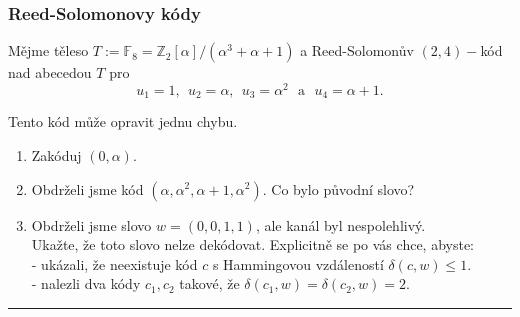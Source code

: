 \documentclass[10pt,a4paper]{article}
\newcommand{\Z}{{\mathbb{Z}}}       %
\newcommand{\F}{{\mathbb{F}}}       %
\newcommand{\hr}{{\begin{center}\par\rule{\textwidth}{0.5pt} \end{center}}}
\begin{document}
\subsubsection{Reed-Solomonovy kódy}
Mějme těleso $T:=\F_8=\Z_2[\alpha]/(\alpha^3+\alpha + 1)$ a Reed-Solomonův $(2,4)-$kód nad abecedou $T$ pro $$u_1=1, ~~u_2=\alpha, ~~u_3 = \alpha^2 \text{ ~a~ } u_4 = \alpha + 1.$$

Tento kód může opravit jednu chybu.
\begin{enumerate}[label=(\alph*)]
    \item Zakóduj $(0,\alpha)$.
    \item Obdrželi jsme kód $(\alpha,\alpha^2, \alpha + 1,\alpha^2)$. Co bylo původní slovo?
    \item Obdrželi jsme slovo $w = (0,0, 1,1)$, ale kanál byl nespolehlivý.\\
    Ukažte, že toto slovo nelze dekódovat. Explicitně se po vás chce, abyste:\\
    - ukázali, že neexistuje kód $c$ s Hammingovou vzdáleností $\delta(c,w) \leq 1$.\\
    - nalezli dva kódy $c_1 ,c_2$ takové, že $\delta(c_1 ,w) = \delta(c_2 ,w) = 2$.
\end{enumerate}

\hr
\end{document}
